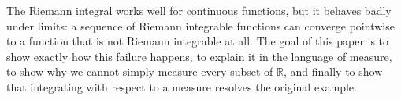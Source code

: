 \documentclass[12pt]{article}
\theoremstyle{plain}
\theoremstyle{definition}
\theoremstyle{definition}
\theoremstyle{remark}
\begin{document}

The Riemann integral works well for continuous functions, but it behaves badly
under limits: a sequence of Riemann integrable functions can converge pointwise to a
function that is not Riemann integrable at all. The goal of this paper is to show
exactly how this failure happens, to explain it in the language of measure, to show
why we cannot simply measure every subset of $\mathbb{R}$, and finally to show
that integrating with respect to a measure resolves the original example.
\end{document}
